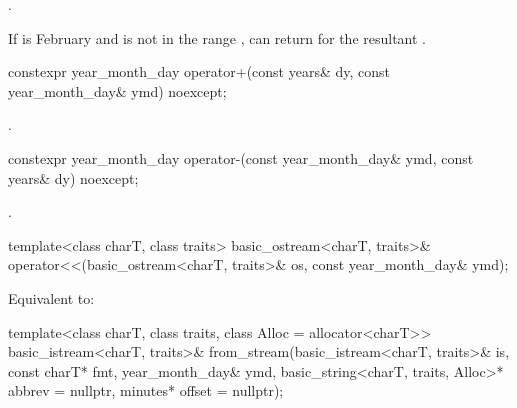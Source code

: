 \begin{itemdescr}
\pnum
\returns
{}.

\pnum
\begin{note}
If  is February
and  is not in the range ,
 can return  for
the resultant .
\end{note}
\end{itemdescr}

%
\begin{itemdecl}
constexpr year_month_day operator+(const years& dy, const year_month_day& ymd) noexcept;
\end{itemdecl}

\begin{itemdescr}
\pnum
\returns
{}.
\end{itemdescr}

%
\begin{itemdecl}
constexpr year_month_day operator-(const year_month_day& ymd, const years& dy) noexcept;
\end{itemdecl}

\begin{itemdescr}
\pnum
\returns
{}.
\end{itemdescr}

%
\begin{itemdecl}
template<class charT, class traits>
  basic_ostream<charT, traits>&
    operator<<(basic_ostream<charT, traits>& os, const year_month_day& ymd);
\end{itemdecl}

\begin{itemdescr}
\pnum
\effects
Equivalent to:
\end{itemdescr}

%
\begin{itemdecl}
template<class charT, class traits, class Alloc = allocator<charT>>
  basic_istream<charT, traits>&
    from_stream(basic_istream<charT, traits>& is, const charT* fmt,
                year_month_day& ymd, basic_string<charT, traits, Alloc>* abbrev = nullptr,
                minutes* offset = nullptr);
\end{itemdecl}

